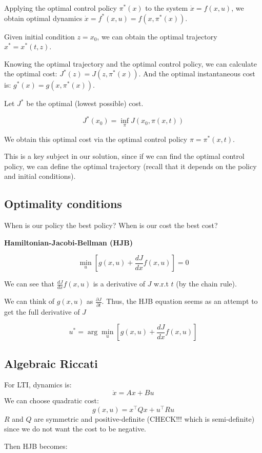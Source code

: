 Applying the optimal control policy $\pi^*(x)$ to the system $\dot{x} = f(x, u)$, we obtain optimal 
dynamics $\dot{x} = f^*(x, u) = f(x, \pi^*(x))$. 

Given initial condition $z = x_0$, we can obtain the optimal trajectory $x^* = x^*(t, z)$. 

Knowing the optimal trajectory and the optimal control policy, we can calculate the optimal cost: $J^*(z) = J(z, \pi^*(x))$. 
And the optimal instantaneous cost is: $g^*(x) = g(x, \pi^*(x))$. 


Let $J^*$ be the optimal (lowest possible) cost. 

\[ J^*(x_0) = \inf_{\pi} J(x_0, \pi(x, t)) \]

We obtain this optimal cost via the optimal control policy $\pi = \pi^*(x, t)$.

This is a key subject in our solution, since if we can find the optimal control policy, we can define the optimal 
trajectory (recall that it depends on the policy and initial conditions). 


\subsection{Optimality conditions}

When is our policy the best policy? When is our cost the best cost?


\textbf{Hamiltonian-Jacobi-Bellman (HJB)}

\[\min_u [g(x, u) + \frac{dJ}{dx} f(x, u)] = 0\]

We can see that $\frac{dJ}{dx} f(x, u)$ is a derivative of $J$ w.r.t $t$ (by the chain rule). 

We can think of $g(x, u)$ as $\frac{\partial J}{\partial t}$. Thus, the HJB equation seems as an attempt to get the full derivative of $J$

\[ u^* = \arg\min_u \left[ g(x, u) + \frac{dJ}{dx} f(x, u) \right] \]

\subsection{Algebraic Riccati}

For LTI, dynamics is:
\[ \dot{x} = Ax + Bu \]
We can choose quadratic cost:
\[ g(x, u) = x^\top Qx + u^\top Ru \]
\( R \) and \( Q \) are symmetric and positive-definite (CHECK!!! which is semi-definite) since we do not want the cost to be negative.


Then HJB becomes:
\[\]


